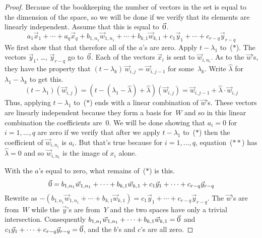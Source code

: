\begin{proof}
Because of the bookkeeping the number of vectors in the set
is equal to the dimension of the space, so 
we will be done if we verify that its elements are linearly independent.
Assume that this is equal to~$\vec{0}$.
\begin{equation*}
  a_1\vec{x}_1+\cdots+a_q\vec{x}_q   
    +b_{1,n_1}\vec{w}_{1,n_1}+\cdots+b_{k,1}\vec{w}_{k,1} 
    +c_1\vec{y}_1+\cdots+c_{r-q}\vec{y}_{r-q}
  \tag{$*$}
\end{equation*}
We first show that that therefore
all of the $a$'s are zero.
Apply $t-\lambda_1$ to~($*$).
The vectors $\vec{y}_1$, \ldots, $\vec{y}_{r-q}$ 
go to~$\vec{0}$.
Each of the vectors $\vec{x}_i$ is sent to 
$\vec{w}_{i,n_i}$.
As to the $\vec{w}$'s, they have the property that
$(t-\lambda_k)\,\vec{w}_{i,j}=\vec{w}_{i,j-1}$ 
for some~$\lambda_k$.
Write $\hat{\lambda}$ for $\lambda_1-\lambda_k$ to get this.
\begin{equation*}
  (t-\lambda_1)(\vec{w}_{i,j})
    =(t-(\lambda_1-\hat{\lambda})+\hat{\lambda})(\vec{w}_{i,j})
    =\vec{w}_{i,j-1}+\hat{\lambda}\cdot\vec{w}_{i,j} 
  \tag{$**$}
\end{equation*}
Thus, applying $t-\lambda_1$ to~($*$) ends with a 
linear combination of $\vec{w}$'s.
These vectors are linearly independent because
they form a basis for~$W$ and so in this linear combination 
the coefficients are~$0$.
We will be done showing that $a_i=0$ for $i=1,\ldots,q$ are zero if
we verify that after we apply $t-\lambda_1$ to~($*$) then
the coefficient of $\vec{w}_{i,n_i}$ is $a_i$.
But that's true because for $i=1,\ldots,q$, 
equation~($**$) has $\hat{\lambda}=0$
and so $\vec{w}_{i,n_i}$ is the image of $x_{i}$ alone.

With the $a$'s equal to zero, what remains of~($*$) is this.
\begin{equation*}
  \vec{0}
  =
    b_{1,n_1}\vec{w}_{1,n_1}+\cdots+b_{k,1}\vec{w}_{k,1}
    +c_1\vec{y}_1+\cdots+c_{r-q}\vec{y}_{r-q}
\end{equation*}
Rewrite as $-(b_{1,n_1}\vec{w}_{1,n_1}+\cdots+b_{k,1}\vec{w}_{k,1})=
    c_1\vec{y}_1+\cdots+c_{r-q}\vec{y}_{r-q}$.
The $\vec{w}$'s are from~$W$ while the $\vec{y}$'s are from~$Y$ and the
two spaces have only a trivial intersection.
Consequently $b_{1,n_1}\vec{w}_{1,n_1}+\cdots+b_{k,1}\vec{w}_{k,1}=\vec{0}$
and $c_1\vec{y}_1+\cdots+c_{r-q}\vec{y}_{r-q}=\vec{0}$,
and the $b$'s and $c$'s are all zero.
\end{proof}




